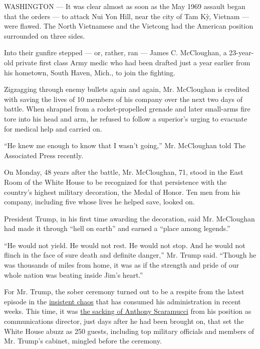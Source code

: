 WASHINGTON --- It was clear almost as soon as the May 1969 assault began
that the orders --- to attack Nui Yon Hill, near the city of Tam Kỳ,
Vietnam --- were flawed. The North Vietnamese and the Vietcong had the
American position surrounded on three sides.

Into their gunfire stepped --- or, rather, ran --- James C. McCloughan,
a 23-year-old private first class Army medic who had been drafted just a
year earlier from his hometown, South Haven, Mich., to join the
fighting.

Zigzagging through enemy bullets again and again, Mr. McCloughan is
credited with saving the lives of 10 members of his company over the
next two days of battle. When shrapnel from a rocket-propelled grenade
and later small-arms fire tore into his head and arm, he refused to
follow a superior's urging to evacuate for medical help and carried on.

``He knew me enough to know that I wasn't going,'' Mr. McCloughan told
The Associated Press recently.

On Monday, 48 years after the battle, Mr. McCloughan, 71, stood in the
East Room of the White House to be recognized for that persistence with
the country's highest military decoration, the Medal of Honor. Ten men
from his company, including five whose lives he helped save, looked on.

President Trump, in his first time awarding the decoration, said Mr.
McCloughan had made it through ``hell on earth'' and earned a ``place
among legends.''

``He would not yield. He would not rest. He would not stop. And he would
not flinch in the face of sure death and definite danger,'' Mr. Trump
said. ``Though he was thousands of miles from home, it was as if the
strength and pride of our whole nation was beating inside Jim's heart.''

For Mr. Trump, the sober ceremony turned out to be a respite from the
latest episode in the
\href{https://www.nytimes.com/2017/07/29/us/politics/trump-presidency-setbacks.html}{insistent
chaos} that has consumed his administration in recent weeks. This time,
it was
\href{https://www.nytimes.com/2017/07/31/us/politics/anthony-scaramucci-white-house.html?hp\&action=click\&pgtype=Homepage\&clickSource=story-heading\&module=first-column-region\&region=top-news\&WT.nav=top-news}{the
sacking of Anthony Scaramucci} from his position as communications
director, just days after he had been brought on, that set the White
House abuzz as 250 guests, including top military officials and members
of Mr. Trump's cabinet, mingled before the ceremony.

